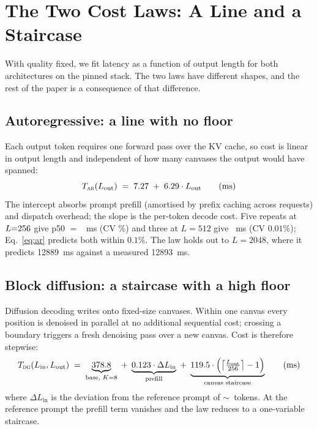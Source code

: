\section{The Two Cost Laws: A Line and a Staircase}
\label{sec:laws}

With quality fixed, we fit latency as a function of output length for both
architectures on the pinned stack. The two laws have different shapes, and the
rest of the paper is a consequence of that difference.

\subsection{Autoregressive: a line with no floor}

Each output token requires one forward pass over the KV cache, so cost is
linear in output length and independent of how many canvases the output would
have spanned:
\begin{equation}
\label{eq:ar}
T_{\textsc{ar}}(L_{\mathrm{out}}) \;=\; 7.27 \;+\; 6.29 \cdot L_{\mathrm{out}}
\qquad\text{(ms)}
\end{equation}
The intercept absorbs prompt prefill (amortised by prefix caching across
requests) and dispatch overhead; the slope is the per-token decode cost. Five
repeats at $L{=}256$ give p50 $=$ \arAnchorTwoFive~ms
(CV \arCV\%) and three at $L{=}512$ give \arAnchorFiveOne~ms (CV $0.01\%$);
Eq.~\ref{eq:ar} predicts both within $0.1\%$. The law holds out to $L{=}2048$,
where it predicts \num{12889}~ms against a measured \num{12893}~ms.

\subsection{Block diffusion: a staircase with a high floor}

Diffusion decoding writes onto fixed-size canvases. Within one canvas every
position is denoised in parallel at no additional sequential cost; crossing a
boundary triggers a fresh denoising pass over a new canvas. Cost is therefore
stepwise:
\begin{equation}
\label{eq:dg}
T_{\textsc{dg}}(L_{\mathrm{in}}, L_{\mathrm{out}}) \;=\;
\underbrace{378.8}_{\text{base, } K=8} \;+\;
\underbrace{0.123 \cdot \Delta L_{\mathrm{in}}}_{\text{prefill}} \;+\;
\underbrace{119.5 \cdot \Bigl(\bigl\lceil \tfrac{L_{\mathrm{out}}}{256}\bigr\rceil - 1\Bigr)}_{\text{canvas staircase}}
\qquad\text{(ms)}
\end{equation}
where $\Delta L_{\mathrm{in}}$ is the deviation from the reference prompt of
$\sim$\ tokens. At the reference prompt the prefill term vanishes
and the law reduces to a one-variable staircase.

